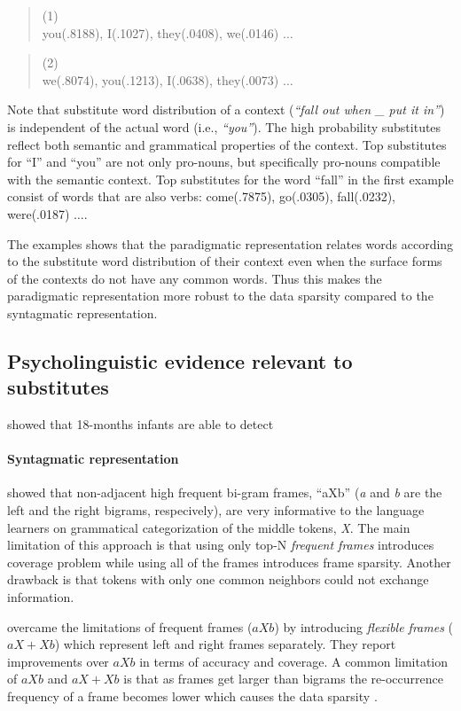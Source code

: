 \begin{quote}
  \small
  (1) \\
   you(.8188), I(.1027), they(.0408), we(.0146) $\ldots$
\end{quote}

\begin{quote}
  \small
  (2) \\
   we(.8074), you(.1213), I(.0638), they(.0073) $\ldots$
\end{quote}

Note that substitute word distribution of a context ({\it ``fall out when \_
put it in''}) is independent of the actual word (i.e., {\it ``you''}).  The
high probability substitutes reflect both semantic and grammatical properties
of the context.  Top substitutes for ``I'' and ``you'' are not only pro-nouns,
but specifically pro-nouns compatible with the semantic context.  Top
substitutes for the word ``fall'' in the first example consist of words that
are also verbs: come(.7875), go(.0305), fall(.0232), were(.0187) $\ldots$.

The examples shows that the paradigmatic representation relates words according
to the substitute word distribution of their context even when the surface
forms of the contexts do not have any common words.  Thus this makes the
paradigmatic representation more robust to the data sparsity compared to the
syntagmatic representation.

\subsection{Psycholinguistic evidence relevant to substitutes}

\cite{gomez2002variability} showed that 18-months infants are able to detect 



\paragraph {Syntagmatic representation} \cite{Mintz200391} showed that
non-adjacent high frequent bi-gram frames, ``aXb'' ({\it a} and {\it b} are the
left and the right bigrams, respecively), are very informative to the language
learners on grammatical categorization of the middle tokens, {\it X}.  The main
limitation of this approach is that using only top-N {\it frequent frames}
introduces coverage problem while using all of the frames introduces frame
sparsity.  Another drawback is that tokens with only one common neighbors could
not exchange information. 

\cite{clair2010} overcame the limitations of frequent frames ($aXb$) by
introducing {\it flexible frames} ($aX+Xb$) which represent left and right
frames separately.  They report improvements over $aXb$ in terms of accuracy
and coverage.  A common limitation of $aXb$ and $aX+Xb$ is that as frames get
larger than bigrams the re-occurrence frequency of a frame becomes lower which
causes the data sparsity \citep*{manning99foundations}.

